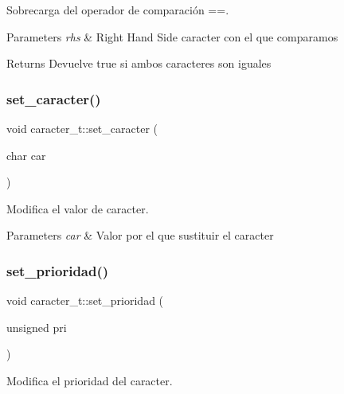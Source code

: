 Sobrecarga del operador de comparación ==. 


\begin{DoxyParams}{Parameters}
{\em rhs} & Right Hand Side caracter con el que comparamos \\
\hline
\end{DoxyParams}
\begin{DoxyReturn}{Returns}
Devuelve true si ambos caracteres son iguales 
\end{DoxyReturn}
\mbox{\label{classcaracter__t_af177f16931bb69024c5a766948985786}} 
\subsubsection{\texorpdfstring{set\+\_\+caracter()}{set\_caracter()}}
{\footnotesize\ttfamily void caracter\+\_\+t\+::set\+\_\+caracter (\begin{DoxyParamCaption}\item[{char}]{car }\end{DoxyParamCaption})}



Modifica el valor de caracter. 


\begin{DoxyParams}{Parameters}
{\em car} & Valor por el que sustituir el caracter \\
\hline
\end{DoxyParams}
\mbox{\label{classcaracter__t_af64d9d63ce21bd3d2c0db44e4caa0974}} 
\subsubsection{\texorpdfstring{set\+\_\+prioridad()}{set\_prioridad()}}
{\footnotesize\ttfamily void caracter\+\_\+t\+::set\+\_\+prioridad (\begin{DoxyParamCaption}\item[{unsigned}]{pri }\end{DoxyParamCaption})}



Modifica el prioridad del caracter. 


